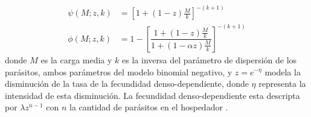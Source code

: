 \documentclass[12pt,a4paper]{article}
\theoremstyle{plain}%
\theoremstyle{definition}
\theoremstyle{remark}
\begin{document}
\begin{itemize}
		
		
		\begin{equation}
		\begin{split}
		\psi(M;z,k)&=\left[ 1+(1-z) \tfrac{M}{k}\right] ^{-(k+1)}\\
		\phi(M;z,k)&=1-\left[ \dfrac{1+(1-z)\frac{M}{k}}{1+(1-\alpha z)\frac{M}{k}}\right] ^{-(k+1)}
		\end{split}
		\end{equation} 
		donde $M$ es la carga media y $k$ es la inversa del parámetro de dispersión de los parásitos, ambos parámetros del modelo binomial negativo, y $z = e^{-\eta}$ 
		modela la disminución de la tasa de la fecundidad denso-dependiente, donde $\eta$ representa la intensidad de esta disminución.
		La fecundidad denso-dependiente
		esta descripta por $\lambda z^{n-1}$ con $n$ la cantidad de parásitos en el
		hospedador \cite{hall2000geographical}.
		
	\end{itemize}
\end{document}
